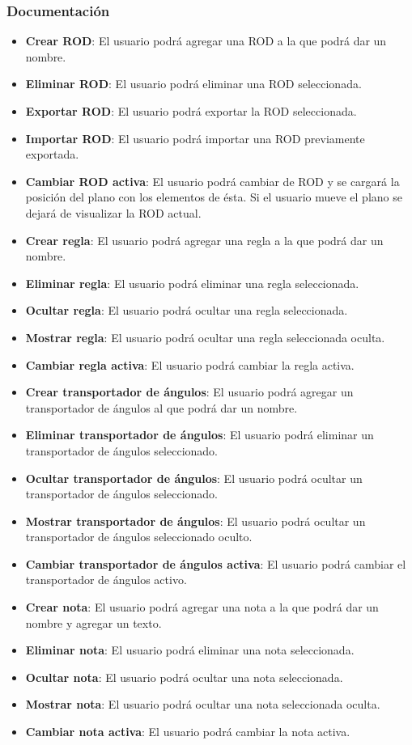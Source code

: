 \subsubsection{Documentación}

\begin{itemize}
	\item \textbf{Crear ROD}: El usuario podrá agregar una ROD a la que podrá dar un nombre.
	\item \textbf{Eliminar ROD}: El usuario podrá eliminar una ROD seleccionada.
	\item \textbf{Exportar ROD}: El usuario podrá exportar la ROD seleccionada.
	\item \textbf{Importar ROD}: El usuario podrá importar una ROD previamente exportada.
	\item \textbf{Cambiar ROD activa}: El usuario podrá cambiar de ROD y se cargará la posición del plano con los elementos de ésta. Si el usuario mueve el plano se dejará de visualizar la ROD actual.
	\item \textbf{Crear regla}: El usuario podrá agregar una regla a la que podrá dar un nombre.
	\item \textbf{Eliminar regla}: El usuario podrá eliminar una regla seleccionada.
	\item \textbf{Ocultar regla}: El usuario podrá ocultar una regla seleccionada.
	\item \textbf{Mostrar regla}: El usuario podrá ocultar una regla seleccionada oculta.
	\item \textbf{Cambiar regla activa}: El usuario podrá cambiar la regla activa.
	\item \textbf{Crear transportador de ángulos}: El usuario podrá agregar un transportador de ángulos al que podrá dar un nombre.
	\item \textbf{Eliminar transportador de ángulos}: El usuario podrá eliminar un transportador de ángulos seleccionado.
	\item \textbf{Ocultar transportador de ángulos}: El usuario podrá ocultar un transportador de ángulos seleccionado.
	\item \textbf{Mostrar transportador de ángulos}: El usuario podrá ocultar un transportador de ángulos seleccionado oculto.
	\item \textbf{Cambiar transportador de ángulos activa}: El usuario podrá cambiar el transportador de ángulos activo.
	\item \textbf{Crear nota}: El usuario podrá agregar una nota a la que podrá dar un nombre y agregar un texto.
	\item \textbf{Eliminar nota}: El usuario podrá eliminar una nota seleccionada.
	\item \textbf{Ocultar nota}: El usuario podrá ocultar una nota seleccionada.
	\item \textbf{Mostrar nota}: El usuario podrá ocultar una nota seleccionada oculta.
	\item \textbf{Cambiar nota activa}: El usuario podrá cambiar la nota activa.
\end{itemize}

